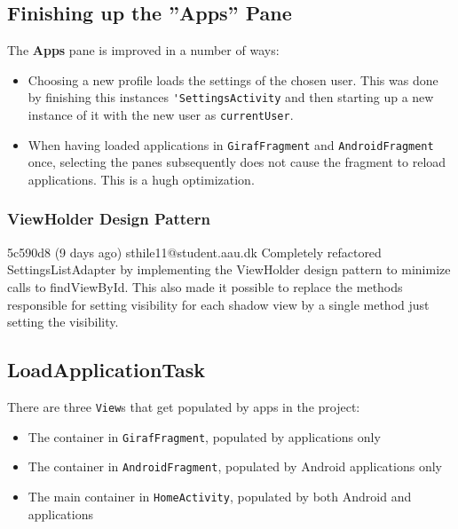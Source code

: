 \subsection{Finishing up the ''Apps'' Pane}

The \textbf{Apps} pane is improved in a number of ways:
\begin{itemize}
\item Choosing a new profile loads the settings of the chosen user.
This was done by finishing this instances \lstinline|'SettingsActivity| and then starting up a new instance of it with the new user as \lstinline|currentUser|.
\item When having loaded applications in \lstinline|GirafFragment| and \lstinline|AndroidFragment| once, selecting the panes subsequently does not cause the fragment to reload applications. This is a hugh optimization.
\end{itemize}

\subsubsection{ViewHolder Design Pattern}
5c590d8 (9 days ago) sthile11@student.aau.dk Completely refactored SettingsListAdapter by implementing the ViewHolder design pattern to minimize calls to findViewById. This also made it possible to replace the methods responsible for setting visibility for each shadow view by a single method just setting the visibility.

\subsection{LoadApplicationTask}\label{sec:sprint4:dev:loadapplicationtask}
There are three \lstinline!View!s that get populated by apps in the \launcher project:

\begin{itemize}
\item The container in \lstinline!GirafFragment!, populated by \giraf applications only
\item The container in \lstinline!AndroidFragment!, populated by Android applications only
\item The main container in \lstinline!HomeActivity!, populated by both Android and \giraf applications
\end{itemize}

